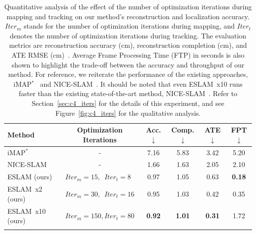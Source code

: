 \begin{table}[t]
    \begin{center}
        \begin{tabular}{l|c|ccc|c}
            \Xhline{2\arrayrulewidth}
            Method & Optimization Iterations & Acc.$\downarrow$ & Comp.$\downarrow$ & ATE$\downarrow$ & FPT$\downarrow$ \\
            
            \hline
            iMAP$^{*}$ & - & 7.16 & 5.83 & 3.42 & 5.20 \\
            NICE-SLAM & - & 1.66 & 1.63 & 2.05 & 2.10 \\
            
            \hline
            ESLAM (ours) & $Iter_{m}=15, \phantom{0} Iter_{t}=8\phantom{0}$  & 0.97 & 1.05  & 0.63 & \textbf{0.18} \\
            ESLAM~x2 (ours) & $Iter_{m}=30, \phantom{0} Iter_{t}=16$  & 0.95 & 1.03  & 0.42 & 0.35 \\
            ESLAM~x10 (ours) & $Iter_{m}=150, Iter_{t}=80$  & \textbf{0.92} & \textbf{1.01}  & \textbf{0.31} & 1.72 \\
            
            \Xhline{2\arrayrulewidth}
        \end{tabular}
    \end{center}
    \caption{Quantitative analysis of the effect of the number of optimization iterations during mapping and tracking on our method's reconstruction and localization accuracy. $Iter_{m}$ stands for the number of optimization iterations during mapping, and $Iter_{t}$ denotes the number of optimization iterations during tracking. The evaluation metrics are reconstruction accuracy (cm), reconstruction completion (cm), and ATE RMSE (cm)~\citep{sturm2012benchmark}. Average Frame Processing Time (FTP) in seconds is also shown to highlight the trade-off between the accuracy and throughput of our method. For reference, we reiterate the performance of the existing approaches, iMAP$^{*}$~\citep{sucar2021imap} and NICE-SLAM~\citep{zhu2022nice}. It should be noted that even ESLAM~x10 runs faster than the existing state-of-the-art method, NICE-SLAM~\citep{zhu2022nice}. Refer to Section~\ref{sec:c4_iters} for the details of this experiment, and see Figure~\ref{fig:c4_iters} for the qualitative analysis.}
    \label{table:iters}
\end{table}

